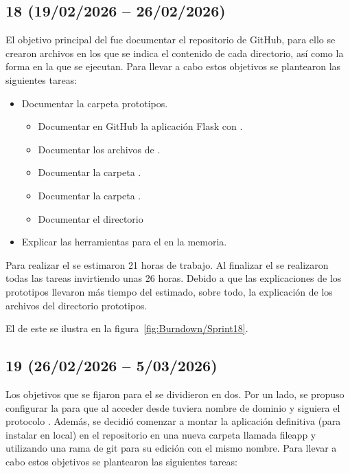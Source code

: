 \subsection{ 18 (19/02/2026 -- 26/02/2026)}
El objetivo principal del  fue documentar el repositorio de GitHub, para ello se crearon archivos  en los que se indica el contenido de cada directorio, así como la forma en la que se ejecutan. Para llevar a cabo estos objetivos se plantearon las siguientes tareas:
\begin{itemize}
\tightlist
	\item Documentar la carpeta prototipos.
		\begin{itemize}
		\tightlist
			\item Documentar en GitHub la aplicación {Flask} con .
			\item Documentar los archivos de .
			\item Documentar la carpeta .
			\item Documentar la carpeta .
			\item Documentar el directorio 
		\end{itemize}
		\item Explicar las herramientas para el  en la memoria.
\end{itemize} 

Para realizar el  se estimaron 21 horas de trabajo. Al finalizar el  se realizaron todas las tareas invirtiendo unas 26 horas. Debido a que las explicaciones de los prototipos llevaron más tiempo del estimado, sobre todo, la explicación de los archivos del directorio prototipos.

El  de este  se ilustra en la figura~\ref{fig:Burndown/Sprint18}.

\subsection{ 19 (26/02/2026 -- 5/03/2026)}
Los objetivos que se fijaron para el  se dividieron en dos. Por un lado, se propuso configurar la  para que al acceder desde  tuviera nombre de dominio y siguiera el protocolo . Además, se decidió comenzar a montar la aplicación definitiva (para instalar en local) en el repositorio en una nueva carpeta llamada file{app} y utilizando una rama de git para su edición con el mismo nombre. Para llevar a cabo estos objetivos se plantearon las siguientes tareas:

